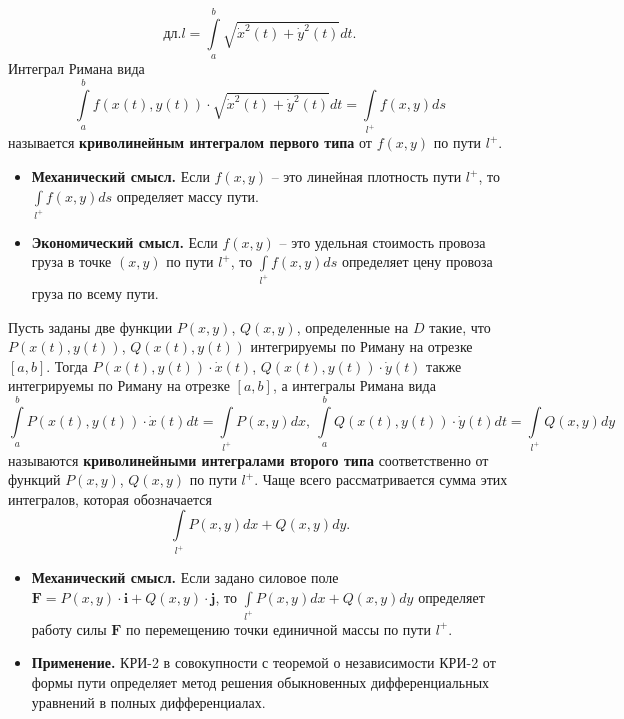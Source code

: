 \documentclass[a4paper, 12pt]{report}
\numberwithin{equation}{section}
\begin{document}
	\begin{equation*}
		\text{дл}.l = \int\limits_a^b\sqrt{\dot {x} ^2 (t) + \dot {y}^2 (t)} dt.
	\end{equation*}
	Интеграл Римана вида
	\begin{equation}
		\int\limits_a^b f(x(t), y(t))\cdot \sqrt{\dot {x} ^2 (t) + \dot {y}^2 (t)} dt = \int\limits_{l^+} f(x,y)ds
	\end{equation}
	называется \textbf{криволинейным интегралом первого типа} от $f(x,y)$ по пути $l^+$.
	\begin{itemize}
		\item \textbf{Механический смысл.} Если $f(x,y)$ -- это линейная плотность пути $l^+$, то $\int\limits_{l^+} f(x,y)ds$ определяет массу пути.
		\item \textbf{Экономический смысл.} Если $f(x,y)$ -- это удельная стоимость провоза груза в точке $(x,y)$ по пути $l^+$, то $\int\limits_{l^+} f(x,y)ds$ определяет цену провоза груза по всему пути.
	\end{itemize}
	Пусть заданы две функции $P(x,y)$, $Q(x,y)$, определенные на $D$ такие, что $P(x(t), y(t))$, $Q(x(t), y(t))$ интегрируемы по Риману на отрезке $[a,b]$. Тогда $P(x(t), y(t))\cdot \dot x (t)$, $Q(x(t), y(t))\cdot \dot y(t)$ также интегрируемы по Риману на отрезке $[a,b]$, а интегралы Римана вида
	\begin{equation}
		\int\limits_a^bP(x(t), y(t))\cdot \dot x (t)dt = \int\limits_{l^+} P(x,y)dx,\ \int\limits_a^bQ(x(t), y(t))\cdot \dot y (t)dt = \int\limits_{l^+} Q(x,y)dy
	\end{equation}
	называются \textbf{криволинейными интегралами второго типа} соответственно от функций $P(x,y)$, $Q(x,y)$ по пути $l^+$.
	Чаще всего рассматривается сумма этих интегралов, которая обозначается
	\begin{equation}
		\int\limits_{l^+} P(x,y)dx + Q(x,y)dy.
	\end{equation}
	\begin{itemize}
		\item \textbf{Механический смысл.} Если задано силовое поле $\mathbf F = P(x,y)\cdot \mathbf i + Q(x,y)\cdot \mathbf j$, то $\int\limits_{l^+} P(x,y)dx + Q(x,y)dy$ определяет работу силы $\mathbf F$ по перемещению точки единичной массы по пути $l^{+}$.
		\item \textbf{Применение.} КРИ-2 в совокупности с теоремой о независимости КРИ-2 от формы пути определяет метод решения обыкновенных дифференциальных уравнений в полных дифференциалах.
	\end{itemize}
\end{document}
